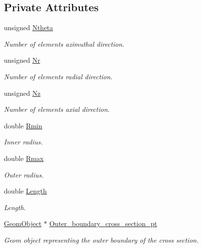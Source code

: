 \subsection*{Private Attributes}
\begin{DoxyCompactItemize}
\item 
unsigned \hyperlink{classoomph_1_1QuarterPipeDomain_aeb912b40da8cd2883768fe2ca989e640}{Ntheta}
\begin{DoxyCompactList}\small\item\em Number of elements azimuthal direction. \end{DoxyCompactList}\item 
unsigned \hyperlink{classoomph_1_1QuarterPipeDomain_a18ac22546af74ac9b76a870d3f5abe3d}{Nr}
\begin{DoxyCompactList}\small\item\em Number of elements radial direction. \end{DoxyCompactList}\item 
unsigned \hyperlink{classoomph_1_1QuarterPipeDomain_aab1bf3900c3537c44942e3fee0c3d24e}{Nz}
\begin{DoxyCompactList}\small\item\em Number of elements axial direction. \end{DoxyCompactList}\item 
double \hyperlink{classoomph_1_1QuarterPipeDomain_ac71370e6c78fd37aa59e7a52d62d1cbe}{Rmin}
\begin{DoxyCompactList}\small\item\em Inner radius. \end{DoxyCompactList}\item 
double \hyperlink{classoomph_1_1QuarterPipeDomain_a5e2252883456cd65902663fda09296d5}{Rmax}
\begin{DoxyCompactList}\small\item\em Outer radius. \end{DoxyCompactList}\item 
double \hyperlink{classoomph_1_1QuarterPipeDomain_a0798f3962e840bdb3d31e4e0dada055d}{Length}
\begin{DoxyCompactList}\small\item\em Length. \end{DoxyCompactList}\item 
\hyperlink{classoomph_1_1GeomObject}{Geom\+Object} $\ast$ \hyperlink{classoomph_1_1QuarterPipeDomain_adad2a4e638bb58eda89a19eaf5e18969}{Outer\+\_\+boundary\+\_\+cross\+\_\+section\+\_\+pt}
\begin{DoxyCompactList}\small\item\em Geom object representing the outer boundary of the cross section. \end{DoxyCompactList}\item 

\end{DoxyCompactItemize}
